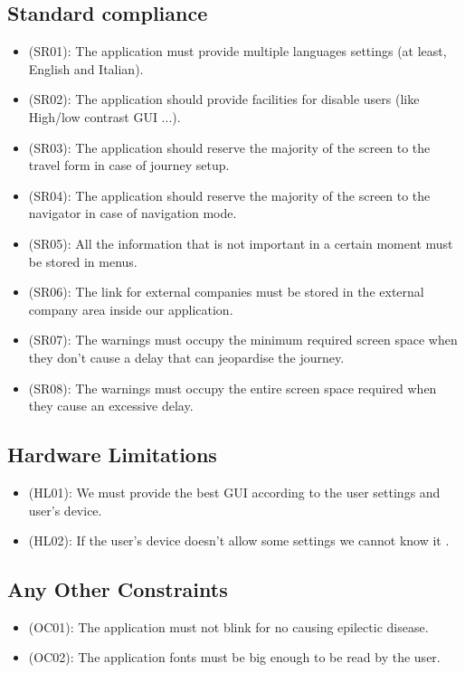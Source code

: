 \documentclass[a4paper,leqno]{book}
\begin{document}
\subsection{Standard compliance}
\begin{itemize}
\item (SR01): The application must provide multiple languages settings (at least, English and Italian).
\item (SR02): The application should provide facilities for disable users (like High/low contrast GUI ...).
\item (SR03): The application should reserve the majority of the screen to the travel form in case of journey setup.
\item (SR04): The application should reserve the majority of the screen to the navigator in case of navigation mode.
\item (SR05): All the information that is not important in a certain moment must be stored in menus.
\item (SR06): The link for external companies must be stored in the external company area inside our application.
\item (SR07): The warnings must occupy the minimum required screen space  when they don't cause a delay that can jeopardise the journey.
\item (SR08): The warnings must occupy the entire screen space required when they cause an excessive delay.
\end{itemize}

\subsection{Hardware Limitations}
\begin{itemize}
\item (HL01): We must provide the best GUI according to the user settings and user's device.
\item (HL02): If the user's device doesn't allow some settings we cannot know it .
\end{itemize}

\subsection{Any Other Constraints}
\begin{itemize}
\item (OC01): The application must not blink for no causing epilectic disease.
\item (OC02): The application fonts must be big enough to be read by the user.
\end{itemize}
\end{document}
